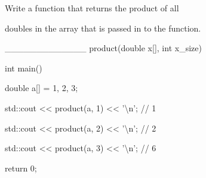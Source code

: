 Write a function that returns the product of all

doubles in the array that is passed in to the function.



\begin{consolethree}[escapeinside=||]

\_\_\_\_\_\_\_\_\_\_\_\_\_ product(double x[], int x\_size)

{

}



int main()

{

    double a[] = {1, 2, 3};

    std::cout << product(a, 1) << '\textbackslash n'; // 1

    std::cout << product(a, 2) << '\textbackslash n'; // 2

    std::cout << product(a, 3) << '\textbackslash n'; // 6

    return 0;

}

\end{consolethree}

